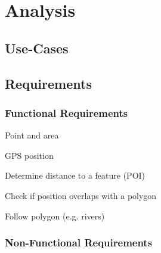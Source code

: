 
\chapter{Analysis}



\section{Use-Cases}


\section{Requirements}


\subsection{Functional Requirements}
\reqstartF
	\item Point and area
	\item GPS position
	\item Determine distance to a feature (POI)
	\item Check if position overlaps with a polygon
	\item Follow polygon (e.g. rivers)
\reqendF


\subsection{Non-Functional Requirements}
